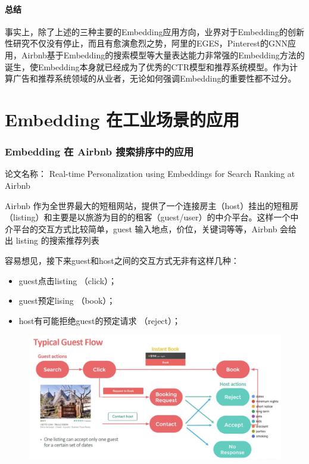\documentclass[12pt]{article}
\begin{document}
\subsection{总结}
事实上，除了上述的三种主要的Embedding应用方向，业界对于Embedding的创新性研究不仅没有停止，而且有愈演愈烈之势，阿里的EGES，Pinterest的GNN应用，Airbnb基于Embedding的搜索模型等大量表达能力非常强的Embedding方法的诞生，使Embedding本身就已经成为了优秀的CTR模型和推荐系统模型。作为计算广告和推荐系统领域的从业者，无论如何强调Embedding的重要性都不过分。

\part{Embedding 在工业场景的应用}
\section{Embedding 在 Airbnb 搜索排序中的应用
\cite{Embedding_In_Realtime_Search_In_Airbnb}\cite{How_Airbnb_Solve_Sparse_Problem_In_Embedding}}
论文名称： Real-time Personalization using Embeddings for Search Ranking at Airbnb 

Airbnb 作为全世界最大的短租网站，提供了一个连接房主（host）挂出的短租房（listing）和主要是以旅游为目的的租客（guest/user）的中介平台。这样一个中介平台的交互方式比较简单，guest 输入地点，价位，关键词等等，Airbnb 会给出 listing 的搜索推荐列表

容易想见，接下来guest和host之间的交互方式无非有这样几种：
\begin{itemize}
\setlength{\itemsep}{0pt}
\setlength{\parsep}{0pt}
\setlength{\parskip}{0pt}
    \item guest点击listing （click）；
    \item guest预定lising （book）；
    \item host有可能拒绝guest的预定请求 （reject）；
\end{itemize}
\begin{figure}[H]
    \centering
    \includegraphics[width=1\textwidth]{fig/Airbnb_User_Interaction.png}
\end{figure}
\end{document}
